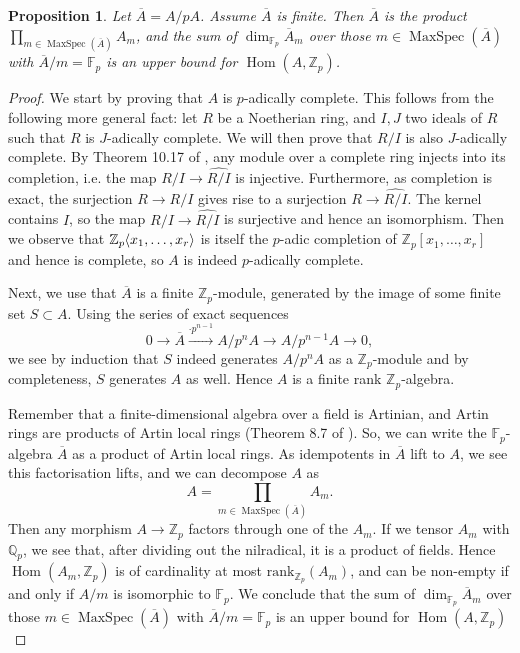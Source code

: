 \documentclass[12pt]{article}
\newcommand{\Z}{\mathbb{Z}}
\newcommand{\Q}{\mathbb{Q}}
\newcommand{\F}{\mathbb{F}}
\renewcommand{\angle}[1]{\hspace{-2pt}\left\langle #1 \right\rangle}
\DeclareMathOperator{\Hom}{Hom}
\DeclareMathOperator{\MaxSpec}{MaxSpec}
\theoremstyle{plain}
\newtheorem{prop}[thm]{Proposition} %
\theoremstyle{definition}
\theoremstyle{remark}
\begin{document}
\begin{prop}
\label{prop:finedix}
Let $\overline{A} = A/pA$. Assume $\overline{A}$ is finite. Then $\overline{A}$ is the product $\prod_{m \in \MaxSpec(\overline{A})} A_m$, and the sum of $\dim_{\F_p} \overline{A}_m$ over those $m\in \MaxSpec(\overline{A})$ with $\overline{A}/m = \F_p$ is an upper bound for $\Hom(A,\Z_p)$.
\end{prop}
\begin{proof}
We start by proving that $A$ is $p$-adically complete. This follows from the following more general fact: let $R$ be a Noetherian ring, and $I,J$ two ideals of $R$ such that $R$ is $J$-adically complete. We will then prove that $R/I$ is also $J$-adically complete. By Theorem 10.17 of \cite{atiyah}, any module over a complete ring injects into its completion, i.e. the map $R/I \to \widehat{R/I}$ is injective. Furthermore, as completion is exact, the surjection $R \to R/I$ gives rise to a surjection $R \to \widehat{R/I}$. The kernel contains $I$, so the map $R/I \to \widehat{R/I}$ is surjective and hence an isomorphism. Then we observe that $\Z_p\angle{x_1,\dots,x_r}$ is itself the $p$-adic completion of $\Z_p[x_1,\dots,x_r]$ and hence is complete, so $A$ is indeed $p$-adically complete.

Next, we use that $\overline{A}$ is a finite $\Z_p$-module, generated by the image of some finite set $S \subset A$. Using the series of exact sequences \[0 \to \overline{A} \xrightarrow{\cdot p^{n-1}} A/p^nA \to A/p^{n-1}A \to 0,\] we see by induction that $S$ indeed generates $A/p^nA$ as a $\Z_p$-module and by completeness, $S$ generates $A$ as well. Hence $A$ is a finite rank $\Z_p$-algebra.

Remember that a finite-dimensional algebra over a field is Artinian, and Artin rings are products of Artin local rings (Theorem 8.7 of \cite{atiyah}). So, we can write the $\F_p$-algebra $\overline{A}$ as a product of Artin local rings. As idempotents in $\overline{A}$ lift to $A$, we see this factorisation lifts, and we can decompose $A$ as
\[
A = \prod_{m \in \MaxSpec(\overline{A})} A_m.
\]
Then any morphism $A \to \Z_p$ factors through one of the $A_m$. If we tensor $A_m$ with $\Q_p$, we see that, after dividing out the nilradical, it is a product of fields. Hence $\Hom(A_m,\Z_p)$ is of cardinality at most $\text{rank}_{\Z_p}(A_m)$, and can be non-empty if and only if $A/m$ is isomorphic to $\F_p$. We conclude that the sum of $\dim_{\F_p} \overline{A}_m$ over those $m\in \MaxSpec(\overline{A})$ with $\overline{A}/m = \F_p$ is an upper bound for $\Hom(A,\Z_p)$
\end{proof}
\end{document}
